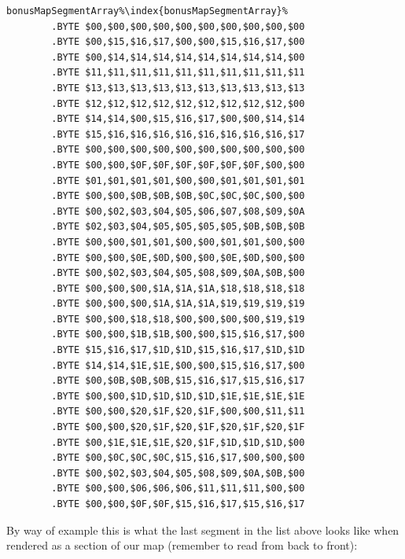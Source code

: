 \begin{lstlisting}[escapechar=\%]
bonusMapSegmentArray%\index{bonusMapSegmentArray}%
        .BYTE $00,$00,$00,$00,$00,$00,$00,$00,$00,$00
        .BYTE $00,$15,$16,$17,$00,$00,$15,$16,$17,$00
        .BYTE $00,$14,$14,$14,$14,$14,$14,$14,$14,$00
        .BYTE $11,$11,$11,$11,$11,$11,$11,$11,$11,$11
        .BYTE $13,$13,$13,$13,$13,$13,$13,$13,$13,$13
        .BYTE $12,$12,$12,$12,$12,$12,$12,$12,$12,$00
        .BYTE $14,$14,$00,$15,$16,$17,$00,$00,$14,$14
        .BYTE $15,$16,$16,$16,$16,$16,$16,$16,$16,$17
        .BYTE $00,$00,$00,$00,$00,$00,$00,$00,$00,$00
        .BYTE $00,$00,$0F,$0F,$0F,$0F,$0F,$0F,$00,$00
        .BYTE $01,$01,$01,$01,$00,$00,$01,$01,$01,$01
        .BYTE $00,$00,$0B,$0B,$0B,$0C,$0C,$0C,$00,$00
        .BYTE $00,$02,$03,$04,$05,$06,$07,$08,$09,$0A
        .BYTE $02,$03,$04,$05,$05,$05,$05,$0B,$0B,$0B
        .BYTE $00,$00,$01,$01,$00,$00,$01,$01,$00,$00
        .BYTE $00,$00,$0E,$0D,$00,$00,$0E,$0D,$00,$00
        .BYTE $00,$02,$03,$04,$05,$08,$09,$0A,$0B,$00
        .BYTE $00,$00,$00,$1A,$1A,$1A,$18,$18,$18,$18
        .BYTE $00,$00,$00,$1A,$1A,$1A,$19,$19,$19,$19
        .BYTE $00,$00,$18,$18,$00,$00,$00,$00,$19,$19
        .BYTE $00,$00,$1B,$1B,$00,$00,$15,$16,$17,$00
        .BYTE $15,$16,$17,$1D,$1D,$15,$16,$17,$1D,$1D
        .BYTE $14,$14,$1E,$1E,$00,$00,$15,$16,$17,$00
        .BYTE $00,$0B,$0B,$0B,$15,$16,$17,$15,$16,$17
        .BYTE $00,$00,$1D,$1D,$1D,$1D,$1E,$1E,$1E,$1E
        .BYTE $00,$00,$20,$1F,$20,$1F,$00,$00,$11,$11
        .BYTE $00,$00,$20,$1F,$20,$1F,$20,$1F,$20,$1F
        .BYTE $00,$1E,$1E,$1E,$20,$1F,$1D,$1D,$1D,$00
        .BYTE $00,$0C,$0C,$0C,$15,$16,$17,$00,$00,$00
        .BYTE $00,$02,$03,$04,$05,$08,$09,$0A,$0B,$00
        .BYTE $00,$00,$06,$06,$06,$11,$11,$11,$00,$00
        .BYTE $00,$00,$0F,$0F,$15,$16,$17,$15,$16,$17
\end{lstlisting}

By way of example this is what the last segment in the list above looks like when 
rendered as a section of our map (remember to read from back to front):

